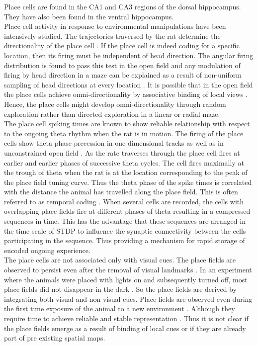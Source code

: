 Place cells are found in the CA1 and CA3 regions of the dorsal hippocampus. They have also been found in the ventral hippocampus. \\ 
Place cell activity in response to environmental manipulations have been intensively studied. The trajectories traversed by the rat determine the directionality of the place cell \cite{Save1998}. If the place cell is indeed coding for a specific location, then its firing must be independent of  head direction. The angular firing distribution is found to pass this test in the open field and any modulation of firing by head direction in a maze can be explained as a result of non-uniform sampling of head directions at every location \cite{Muller1994}. It is possible that in the open field the place cells achieve omni-directionality by associative binding of local views \cite{Sharp1991}. Hence, the place cells might develop omni-directionality through random exploration rather than directed exploration in a linear or radial maze.\\

The place cell spiking times are known to show reliable relationship with respect to the ongoing theta rhythm when the rat is in motion. The firing of the place cells show theta phase precession in one dimensional tracks \cite{O'Keefe1993} as well as in unconstrained open field \cite{Skaggs1996c}. As the rate traverses through the place cell fires at earlier and earlier phases of successive theta cycles. The cell fires maximally at the trough of theta when the rat is at the location corresponding to the peak of the place field tuning curve. Thus the theta phase of the spike times is correlated with the distance the animal has travelled along the place field. This is often referred to as temporal coding \cite{Huxter2003}. When several cells are recorded, the cells with overlapping place fields fire at different phases of theta resulting in a compressed sequences in time. This has the advantage that these sequences are arranged in the time scale of STDP to influence the synaptic connectivity between the cells participating in the sequence. Thus providing a mechanism for rapid storage of encoded ongoing experience. \\
The place cells are not associated only with visual cues. The place fields are observed to persist even after the removal of visual landmarks \cite{Kubie1987}. In an experiment where the animals were placed with lights on and subsequently turned off, most place fields did not disappear in the dark \cite{Muller2008}. So the place fields are derived by integrating both visual and non-visual cues. Place fields are observed even during the first time exposure of the animal to a new environment \cite{Reccivcd1978, Tanila1997}. Although they require time to achieve reliable and stable representation \cite{Wilson1993a}. Thus it is not clear if the place fields emerge  as a result of binding of local cues or if they are already part of pre existing spatial maps.  
 
